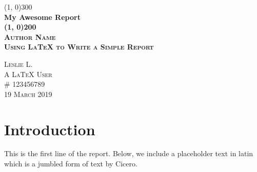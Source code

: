 \documentclass{article}
\begin{document}
\begin{titlepage}

\begin{center}
\line(1, 0){300}\\
[0.25in]
\huge\bfseries My Awesome Report\\
[2mm]
\line(1, 0){200}\\
[1.5cm]
\textsc{\LARGE Author Name}\\
[0.75cm]
\textsc{\Large Using LaTeX to Write a Simple Report}\\
[9cm]
\begin{flushright}
\textsc{\large Leslie L.\\
A LaTeX User\\
\# 123456789\\
19 March 2019\\}
\end{flushright}

\end{center}

\end{titlepage}

\section{Introduction}\label{sec:intro}
This is the first line of the report.  Below, we include a placeholder text in latin which is
a jumbled form of text by Cicero.

\lipsum[1]
\end{document}
